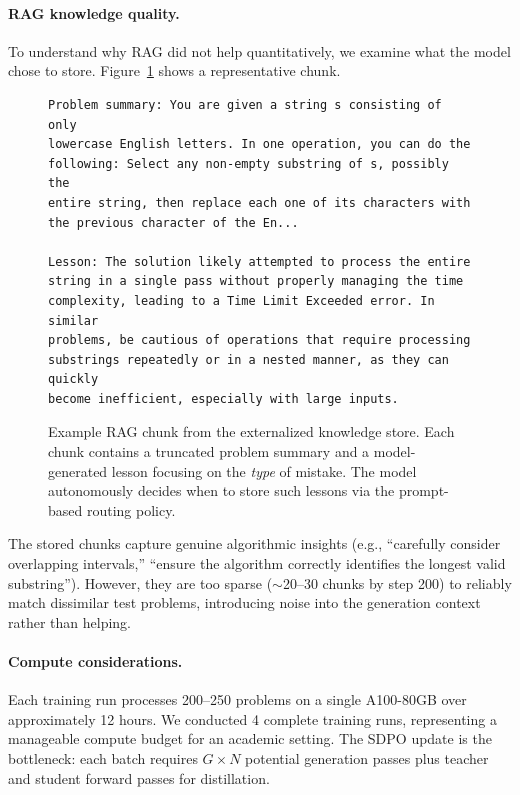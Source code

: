 \documentclass[11pt]{article}
\begin{document}
\paragraph{RAG knowledge quality.} To understand why RAG did not help quantitatively, we examine what the model chose to store. Figure~\ref{fig:ragchunk} shows a representative chunk.

\begin{figure}[h]
\centering
\begin{minipage}{0.92\textwidth}
\begin{lstlisting}
Problem summary: You are given a string s consisting of only
lowercase English letters. In one operation, you can do the
following: Select any non-empty substring of s, possibly the
entire string, then replace each one of its characters with
the previous character of the En...

Lesson: The solution likely attempted to process the entire
string in a single pass without properly managing the time
complexity, leading to a Time Limit Exceeded error. In similar
problems, be cautious of operations that require processing
substrings repeatedly or in a nested manner, as they can quickly
become inefficient, especially with large inputs.
\end{lstlisting}
\end{minipage}
\caption{Example RAG chunk from the externalized knowledge store. Each chunk contains a truncated problem summary and a model-generated lesson focusing on the \emph{type} of mistake. The model autonomously decides when to store such lessons via the prompt-based routing policy.}
\label{fig:ragchunk}
\end{figure}

The stored chunks capture genuine algorithmic insights (e.g., ``carefully consider overlapping intervals,'' ``ensure the algorithm correctly identifies the longest valid substring''). However, they are too sparse ($\sim$20--30 chunks by step 200) to reliably match dissimilar test problems, introducing noise into the generation context rather than helping.

\paragraph{Compute considerations.} Each training run processes 200--250 problems on a single A100-80GB over approximately 12 hours. We conducted 4 complete training runs, representing a manageable compute budget for an academic setting. The SDPO update is the bottleneck: each batch requires $G \times N$ potential generation passes plus teacher and student forward passes for distillation.
\end{document}
